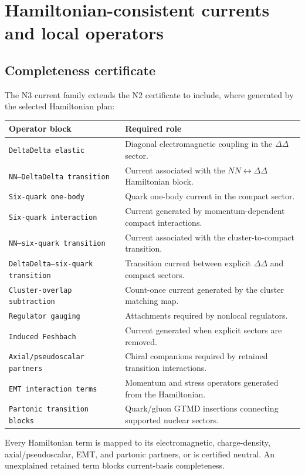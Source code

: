 \documentclass[11pt]{article}
\begin{document}
\section{Hamiltonian-consistent currents and local operators}
\label{sec:currents}

\subsection{Completeness certificate}

The N3 current family extends the N2 certificate to include, where generated by the selected Hamiltonian plan:
{\small
\begin{longtable}{L{0.38\textwidth}L{0.54\textwidth}}
\toprule
Operator block & Required role \\
\midrule
\endhead
\texttt{DeltaDelta elastic} & Diagonal electromagnetic coupling in the \(\Delta\Delta\) sector. \\
\texttt{NN--DeltaDelta transition} & Current associated with the \(NN\leftrightarrow\Delta\Delta\) Hamiltonian block. \\
\texttt{Six-quark one-body} & Quark one-body current in the compact sector. \\
\texttt{Six-quark interaction} & Current generated by momentum-dependent compact interactions. \\
\texttt{NN--six-quark transition} & Current associated with the cluster-to-compact transition. \\
\texttt{DeltaDelta--six-quark transition} & Transition current between explicit \(\Delta\Delta\) and compact sectors. \\
\texttt{Cluster-overlap subtraction} & Count-once current generated by the cluster matching map. \\
\texttt{Regulator gauging} & Attachments required by nonlocal regulators. \\
\texttt{Induced Feshbach} & Current generated when explicit sectors are removed. \\
\texttt{Axial/pseudoscalar partners} & Chiral companions required by retained transition interactions. \\
\texttt{EMT interaction terms} & Momentum and stress operators generated from the Hamiltonian. \\
\texttt{Partonic transition blocks} & Quark/gluon GTMD insertions connecting supported nuclear sectors. \\
\bottomrule
\end{longtable}
}
Every Hamiltonian term is mapped to its electromagnetic, charge-density, axial/pseudoscalar, EMT, and partonic partners, or is certified neutral.  An unexplained retained term blocks current-basis completeness.
\end{document}
